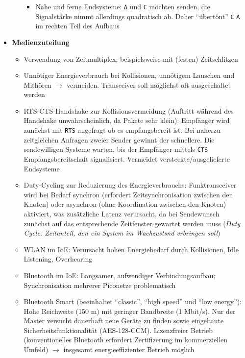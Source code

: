 \begin{itemize}
\begin{itemize}
\begin{itemize}
			\item Nahe und ferne Endsysteme: \texttt{A} und \texttt{C} möchten senden, die Signalstärke nimmt allerdings quadratisch ab. Daher "`übertönt"' \texttt{C} \texttt{A} im rechten Teil des Aufbaus
		\end{itemize}
	\end{itemize}
	\item \textbf{Medienzuteilung}
	\begin{itemize}
		\item Verwendung von Zeitmultiplex, beispielsweise mit (festen) Zeitschlitzen
		\item Unnötiger Energieverbrauch bei Kollisionen, unnötigem Lauschen und Mithören \(\rightarrow\) vermeiden. Transceiver soll möglichst oft ausgeschaltet werden
		\item RTS-CTS-Handshake zur Kollisionsvermeidung (Auftritt während des Handshake unwahrscheinlich, da Pakete sehr klein): Empfänger wird zunächst mit \texttt{RTS} angefragt ob es empfangsbereit ist. Bei naherzu zeitgleichen Anfragen zweier Sender gewinnt der schnellere. Die sendewilligen Systeme warten, bis der Empfänger mittels \texttt{CTS} Empfangsbereitschaft signalisiert. Vermeidet versteckte/ausgelieferte Endsysteme
		\item Duty-Cycling zur Reduzierung des Energieverbrauchs: Funktransceiver wird bei Bedarf synchron (erfordert Zeitsynchronisation zwischen den Knoten) oder asynchron (ohne Koordination zwischen den Knoten) aktiviert, was zusätzliche Latenz verursacht, da bei Sendewunsch zunächst auf das entsprechende Zeitfenster gewartet werden muss (\textit{Duty Cycle: Zeitanteil, den ein System im Wachzustsnd vrbringen soll})
		\item WLAN im IoE: Verursacht hohen Energiebedarf durch Kollisionen, Idle Listening, Overhearing
		\item Bluetooth im IoE: Langsamer, aufwendiger Verbindungsaufbau; Synchronisation mehrerer Piconetze problematisch
		\item Bluetooth Smart (beeinhaltet "`classic"', "`high speed"' und "`low energy"'): Hohe Reichweite (150 m) mit geringer Bandbreite (1 Mbit/s). Nur der Master versucht dauerhaft neue Geräte zu finden sowie eingebaute Sicherheitsfunktionalität (AES-128-CCM). Lizenzfreier Betrieb (konventionelles Bluetooth erfordert Zertifizerung im kommerziellen Umfeld) \(\rightarrow\) insgesamt energieeffizienter Betrieb möglich
	\end{itemize}
\end{itemize}

